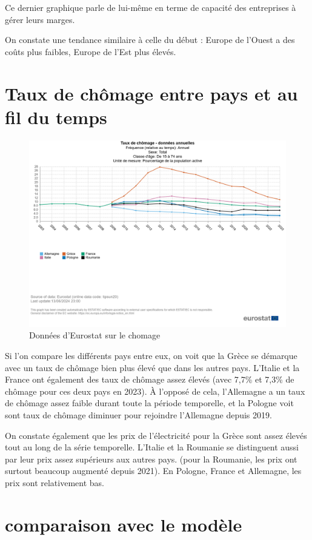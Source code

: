 \documentclass{article}
\begin{document}
Ce dernier graphique parle de lui-même en terme de capacité des entreprises à gérer leurs marges.

On constate une tendance similaire à celle du début : Europe de l'Ouest a des coûts plus faibles, Europe de l'Est plus élevés.



\clearpage

\section{Taux de chômage entre pays et au fil du temps}
\begin{figure}[H]
  \centering
  \begin{minipage}{0.8\textwidth}
      \centering
      \includegraphics[width=\textwidth]{"chomage.png"}
      \caption{Données d'Eurostat sur le chomage}
  \end{minipage}
\end{figure}

Si l'on compare les différents pays entre eux, on voit que la Grèce se démarque avec un taux de chômage bien plus élevé que dans les autres pays.  L'Italie et la France ont également des taux de chômage assez élevés (avec 7,7\% et 7,3\% de chômage pour ces deux pays en 2023). À l'opposé de cela, l'Allemagne a un taux de chômage assez faible durant toute la période temporelle, et la Pologne voit sont taux de chômage diminuer pour rejoindre l'Allemagne depuis 2019.

On constate également que les prix de l'électricité pour la Grèce sont assez élevés tout au long de la série temporelle. L'Italie et la Roumanie se distinguent aussi par leur prix assez supérieurs aux autres pays. (pour la Roumanie, les prix ont surtout beaucoup augmenté depuis 2021). En Pologne, France et Allemagne, les prix sont relativement bas.
\section{comparaison avec le modèle}
\end{document}
